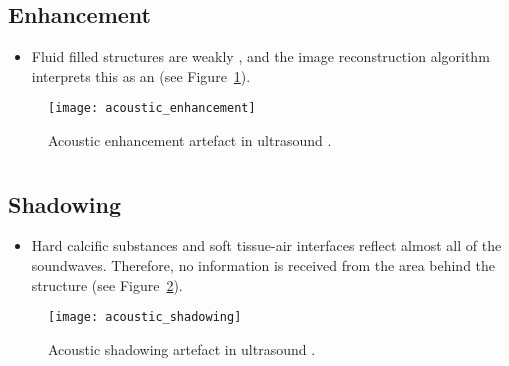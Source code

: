 \section*{}
\subsection{Enhancement}
\begin{itemize}
\item Fluid filled structures are weakly
  ,
  and the image reconstruction algorithm interprets this as an
   (see
  Figure~\ref{fig:acoustic_enhancement}).
\end{itemize}
\vspace{-3ex}
\begin{figure}[!h]
  \centering
  \texttt{[image: acoustic\_enhancement]}
  \caption{Acoustic enhancement artefact in ultrasound
    \cite{abdulla2025ultrasound_artefacts}.\label{fig:acoustic_enhancement}}
\end{figure}

\section*{}
\subsection{Shadowing}
\begin{itemize}
\item Hard calcific substances and soft tissue-air interfaces reflect almost all of the soundwaves. Therefore, no information is received from the area behind the structure (see
  Figure~\ref{fig:acoustic_shadowing}).
\end{itemize}
\vspace{-4ex}
\begin{figure}[!h]
  \centering
  \texttt{[image: acoustic\_shadowing]}
  \caption{Acoustic shadowing artefact in ultrasound
    \cite{abdulla2025ultrasound_artefacts}.\label{fig:acoustic_shadowing}}
\end{figure}

\section*{}
